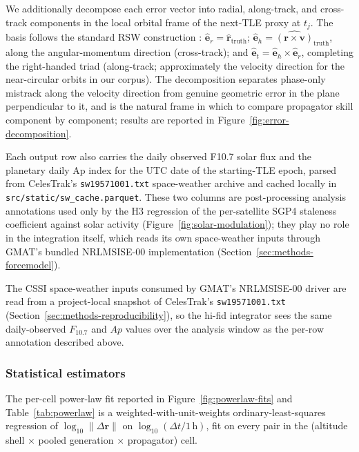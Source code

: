 \documentclass[10pt, letterpaper]{article}
\begin{document}
We additionally decompose each error vector into radial, along-track,
and cross-track components in the local orbital frame of the
next-TLE proxy at $t_{j}$. The basis follows the standard RSW construction
\citep[\S\,3.4]{vallado2013}:
$\hat{\mathbf{e}}_{r} = \hat{\mathbf{r}}_{\mathrm{truth}}$;
$\hat{\mathbf{e}}_{h} = \widehat{(\mathbf{r}\times\mathbf{v})}
_{\mathrm{truth}}$, along the angular-momentum direction
(cross-track); and
$\hat{\mathbf{e}}_{t} = \hat{\mathbf{e}}_{h}\times\hat{\mathbf{e}}_{r}$,
completing the right-handed triad (along-track; approximately the
velocity direction for the near-circular orbits in our corpus). The
decomposition separates phase-only mistrack along the velocity
direction from genuine geometric error in the plane perpendicular to
it, and is the natural frame in which to compare propagator skill
component by component; results are reported in
Figure~\ref{fig:error-decomposition}.

Each output row also carries the daily observed F10.7 solar flux
and the planetary daily Ap index for the UTC date of the starting-TLE
epoch, parsed from CelesTrak's \texttt{sw19571001.txt} space-weather
archive and cached locally in \texttt{src/static/sw\_cache.parquet}.
These two columns are post-processing analysis annotations used only
by the H3 regression of the per-satellite SGP4 staleness coefficient
against solar activity (Figure~\ref{fig:solar-modulation}); they
play no role in the integration itself, which reads its own
space-weather inputs through GMAT's bundled NRLMSISE-00
implementation (Section~\ref{sec:methods-forcemodel}).

The CSSI space-weather inputs consumed by GMAT's NRLMSISE-00 driver
are read from a project-local snapshot of CelesTrak's
\texttt{sw19571001.txt} (Section~\ref{sec:methods-reproducibility}),
so the hi-fid integrator sees the same daily-observed $F_{10.7}$ and
$Ap$ values over the analysis window as the per-row annotation
described above.

\subsubsection{Statistical estimators}
\label{sec:methods-statistics}

The per-cell power-law fit reported in
Figure~\ref{fig:powerlaw-fits} and Table~\ref{tab:powerlaw} is a
weighted-with-unit-weights ordinary-least-squares regression of
$\log_{10}\lVert\Delta\mathbf{r}\rVert$ on
$\log_{10}(\Delta t / 1\,\text{h})$, fit on every pair in the
(altitude shell $\times$ pooled generation $\times$ propagator) cell.
\end{document}
